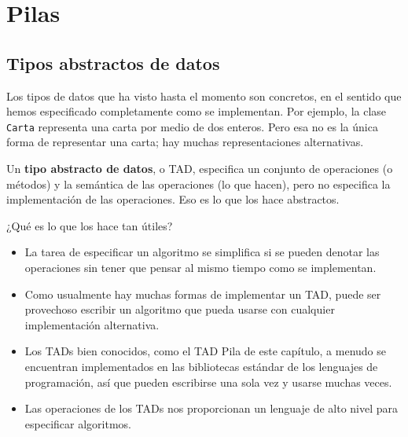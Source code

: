 

%

\chapter{Pilas}

\section{Tipos abstractos de datos}

Los tipos de datos que ha visto hasta el momento son concretos, en el
sentido que hemos especificado completamente como se implementan. Por
ejemplo, la clase  \texttt{Carta} representa una carta por medio de
dos enteros. Pero esa no es la única forma de representar una carta; 
hay muchas representaciones alternativas.

Un {\bf tipo abstracto de datos}, o TAD, especifica un conjunto de
operaciones (o métodos) y la semántica de las operaciones (lo que
hacen), pero no especifica la implementación de las operaciones. Eso
es lo que los hace abstractos.

¿Qué es lo que los hace tan útiles?

\begin{itemize}

\item La tarea de especificar un algoritmo se simplifica si se 
pueden denotar las operaciones sin tener que pensar al mismo 
tiempo como se implementan.

\item Como usualmente hay muchas formas de implementar un TAD,
puede ser provechoso escribir un algoritmo que pueda usarse
con cualquier implementación alternativa.

\item Los TADs bien conocidos, como el TAD Pila de este capítulo,
a menudo se encuentran implementados en las bibliotecas estándar
de los lenguajes de programación, así que pueden escribirse una
sola vez y usarse muchas veces.

\item Las operaciones de los TADs nos proporcionan un lenguaje
de alto nivel para especificar algoritmos.

\end{itemize}

